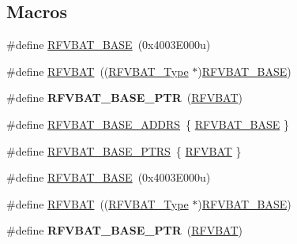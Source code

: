 \subsection*{Macros}
\begin{DoxyCompactItemize}
\item 
\#define \hyperlink{group__RFVBAT__Peripheral__Access__Layer_gad95e9110d4335fec45f55c54ed3f4814}{R\+F\+V\+B\+A\+T\+\_\+\+B\+A\+SE}~(0x4003\+E000u)
\item 
\#define \hyperlink{group__RFVBAT__Peripheral__Access__Layer_gac2c2895b56604565c1deab90aedbf1a4}{R\+F\+V\+B\+AT}~((\hyperlink{structRFVBAT__Type}{R\+F\+V\+B\+A\+T\+\_\+\+Type} $\ast$)\hyperlink{group__RFVBAT__Peripheral__Access__Layer_gad95e9110d4335fec45f55c54ed3f4814}{R\+F\+V\+B\+A\+T\+\_\+\+B\+A\+SE})
\item 
\#define {\bfseries R\+F\+V\+B\+A\+T\+\_\+\+B\+A\+S\+E\+\_\+\+P\+TR}~(\hyperlink{group__RFVBAT__Peripheral__Access__Layer_gac2c2895b56604565c1deab90aedbf1a4}{R\+F\+V\+B\+AT})\hypertarget{group__RFVBAT__Peripheral__Access__Layer_ga5b6418d9be20f84b2190ccf6134b7ba3}{}\label{group__RFVBAT__Peripheral__Access__Layer_ga5b6418d9be20f84b2190ccf6134b7ba3}

\item 
\#define \hyperlink{group__RFVBAT__Peripheral__Access__Layer_ga25ff0ced97c85e35f9cb02f4fac888dd}{R\+F\+V\+B\+A\+T\+\_\+\+B\+A\+S\+E\+\_\+\+A\+D\+D\+RS}~\{ \hyperlink{group__RFVBAT__Peripheral__Access__Layer_gad95e9110d4335fec45f55c54ed3f4814}{R\+F\+V\+B\+A\+T\+\_\+\+B\+A\+SE} \}
\item 
\#define \hyperlink{group__RFVBAT__Peripheral__Access__Layer_gab0495e22a00c365211c3c8510feca9f2}{R\+F\+V\+B\+A\+T\+\_\+\+B\+A\+S\+E\+\_\+\+P\+T\+RS}~\{ \hyperlink{group__RFVBAT__Peripheral__Access__Layer_gac2c2895b56604565c1deab90aedbf1a4}{R\+F\+V\+B\+AT} \}
\item 
\#define \hyperlink{group__RFVBAT__Peripheral__Access__Layer_gad95e9110d4335fec45f55c54ed3f4814}{R\+F\+V\+B\+A\+T\+\_\+\+B\+A\+SE}~(0x4003\+E000u)
\item 
\#define \hyperlink{group__RFVBAT__Peripheral__Access__Layer_gac2c2895b56604565c1deab90aedbf1a4}{R\+F\+V\+B\+AT}~((\hyperlink{structRFVBAT__Type}{R\+F\+V\+B\+A\+T\+\_\+\+Type} $\ast$)\hyperlink{group__RFVBAT__Peripheral__Access__Layer_gad95e9110d4335fec45f55c54ed3f4814}{R\+F\+V\+B\+A\+T\+\_\+\+B\+A\+SE})
\item 
\#define {\bfseries R\+F\+V\+B\+A\+T\+\_\+\+B\+A\+S\+E\+\_\+\+P\+TR}~(\hyperlink{group__RFVBAT__Peripheral__Access__Layer_gac2c2895b56604565c1deab90aedbf1a4}{R\+F\+V\+B\+AT})\hypertarget{group__RFVBAT__Peripheral__Access__Layer_ga5b6418d9be20f84b2190ccf6134b7ba3}{}\label{group__RFVBAT__Peripheral__Access__Layer_ga5b6418d9be20f84b2190ccf6134b7ba3}


\end{DoxyCompactItemize}
